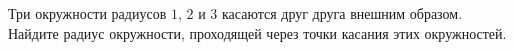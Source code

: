 \begin{ex}
	\begin{condition}
		Три окружности радиусов \( 1 \), \( 2  \) и \( 3  \) касаются друг друга внешним образом. Найдите радиус окружности, проходящей через точки касания этих окружностей.
	\end{condition}
\end{ex}